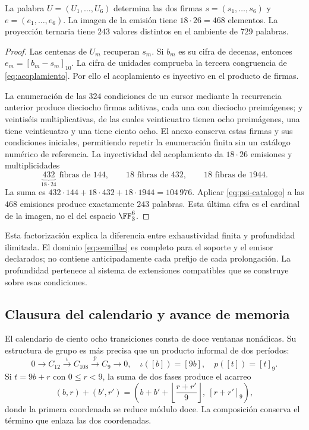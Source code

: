 \begin{proposition}
La palabra \(U=(U_1,\ldots,U_6)\) determina las dos firmas \(s=(s_1,\ldots,s_6)\) y \(e=(e_1,\ldots,e_6)\). La imagen de la emisión tiene \(18\cdot26=468\) elementos. La proyección ternaria tiene \(243\) valores distintos en el ambiente de \(729\) palabras.
\end{proposition}
\begin{proof}
Las centenas de \(U_m\) recuperan \(s_m\). Si \(b_m\) es su cifra de decenas, entonces \(e_m=[b_m-s_m]_{10}\). La cifra de unidades comprueba la tercera congruencia de \eqref{eq:acoplamiento}. Por ello el acoplamiento es inyectivo en el producto de firmas.

La enumeración de las \(324\) condiciones de un cursor mediante la recurrencia anterior produce dieciocho firmas aditivas, cada una con dieciocho preimágenes; y veintiséis multiplicativas, de las cuales veinticuatro tienen ocho preimágenes, una tiene veinticuatro y una tiene ciento ocho. El anexo conserva estas firmas y sus condiciones iniciales, permitiendo repetir la enumeración finita sin un catálogo numérico de referencia. La inyectividad del acoplamiento da \(18\cdot26\) emisiones y multiplicidades
\[
 \underbrace{432}_{18\cdot24}\text{ fibras de }144,
 \qquad18\text{ fibras de }432,
 \qquad18\text{ fibras de }1944.
\]
La suma es \(432\cdot144+18\cdot432+18\cdot1944=104\,976\). Aplicar \eqref{eq:psi-catalogo} a las \(468\) emisiones produce exactamente \(243\) palabras. Esta última cifra es el cardinal de la imagen, no el del espacio \(\FF_3^6\).
\end{proof}

Esta factorización explica la diferencia entre exhaustividad finita y profundidad ilimitada. El dominio \eqref{eq:semillas} es completo para el soporte y el emisor declarados; no contiene anticipadamente cada prefijo de cada prolongación. La profundidad pertenece al sistema de extensiones compatibles que se construye sobre esas condiciones.

\subsection{Clausura del calendario y avance de memoria}

El calendario de ciento ocho transiciones consta de doce ventanas nonádicas. Su estructura de grupo es más precisa que un producto informal de dos períodos:
\begin{equation}
 0\longrightarrow C_{12}\xrightarrow{\iota}C_{108}
 \xrightarrow{p}C_9\longrightarrow0,
 \quad\iota([b])=[9b],\quad p([t])=[t]_9.
 \label{eq:extension108}
\end{equation}
Si \(t=9b+r\) con \(0\le r<9\), la suma de dos fases produce el acarreo
\[
 (b,r)+(b',r')=
 \left(b+b'+\left\lfloor\frac{r+r'}9\right\rfloor,\ [r+r']_9\right),
\]
donde la primera coordenada se reduce módulo doce. La composición conserva el término que enlaza las dos coordenadas.

